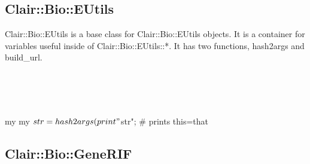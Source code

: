 \subsection{Clair::Bio::EUtils}

Clair::Bio::EUtils is a base class for Clair::Bio::EUtils objects.  It is a container for variables useful inside of Clair::Bio::EUtils::*.
It has two functions, hash2args and build\_url.
\\
\\
\\
\\
\begin{boxedverbatim}

my %
my $str = hash2args(%
print "$str\n"; # prints this=that%

\end{boxedverbatim}

\subsection{Clair::Bio::GeneRIF}

